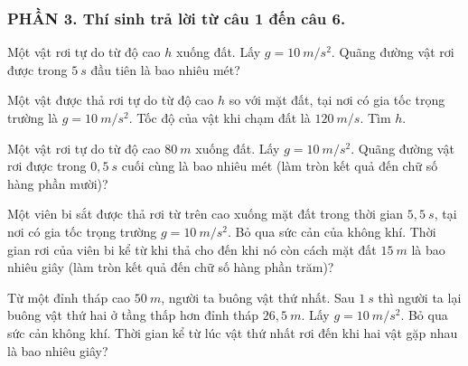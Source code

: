 \subsubsection*{PHẦN 3. Thí sinh trả lời từ câu 1 đến câu 6.}
\setcounter{ex}{0} 
\begin{ex}%
Một vật rơi tự do từ độ cao $h$ xuống đất. Lấy $g=10\ m/s^2$. Quãng đường vật rơi được trong $5\ s$ đầu tiên là bao nhiêu mét?
\loigiai{
}
\end{ex}
\begin{ex}
Một vật được thả rơi tự do từ độ cao $h$ so với mặt đất, tại nơi có gia tốc trọng trường là $g=10 \ m/s^2$.
Tốc độ của vật khi chạm đất là $120 \ m/s$. Tìm $h$.
\end{ex}

\begin{ex}%
Một vật rơi tự do từ độ cao $80\ m$ xuống đất. Lấy $g=10\ m/s^2$. Quãng đường vật rơi được trong $0,5\ s$ cuối cùng là bao nhiêu mét (làm tròn kết quả đến chữ số hàng phần mười)?
\loigiai{
}
\end{ex}
\begin{ex}
Một viên bi sắt được thả rơi từ trên cao xuống mặt đất trong thời gian $5,5 \ s$, tại nơi có gia tốc trọng trường $g=10 \ m/s^2$. Bỏ qua sức cản của không khí. Thời gian rơi của viên bi kể từ khi thả cho đến khi nó còn cách mặt đất $15\ m$ là bao nhiêu giây (làm tròn kết quả đến chữ số hàng phần trăm)? 
\end{ex}

\begin{ex}%
Từ một đỉnh tháp cao $50\ m$, người ta buông vật thứ nhất. Sau $1\ s$ thì người ta lại buông vật thứ hai ở tầng thấp hơn đỉnh tháp $26,5\ m$. Lấy $g=10\ m/s^2$. Bỏ qua sức cản không khí. Thời gian kể từ lúc vật thứ nhất rơi đến khi hai vật gặp nhau là bao nhiêu giây?
\loigiai{
}
\end{ex}

